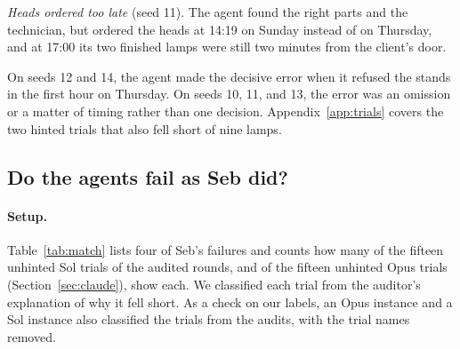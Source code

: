 \documentclass[10pt]{article}
\begin{document}
\emph{Heads ordered too late} (seed 11). The agent found the right parts and the technician, but ordered the heads at 14:19 on Sunday instead of on Thursday, and at 17:00 its two finished lamps were still two minutes from the client's door.

On seeds 12 and 14, the agent made the decisive error when it refused the stands in the first hour on Thursday. On seeds 10, 11, and 13, the error was an omission or a matter of timing rather than one decision. Appendix~\ref{app:trials} covers the two hinted trials that also fell short of nine lamps.

\subsection{Do the agents fail as Seb did?}
\label{sec:match}

\paragraph{Setup.} Table~\ref{tab:match} lists four of Seb's failures and counts how many of the fifteen unhinted Sol trials of the audited rounds, and of the fifteen unhinted Opus trials (Section~\ref{sec:claude}), show each. We classified each trial from the auditor's explanation of why it fell short. As a check on our labels, an Opus instance and a Sol instance also classified the trials from the audits, with the trial names removed.
\end{document}

